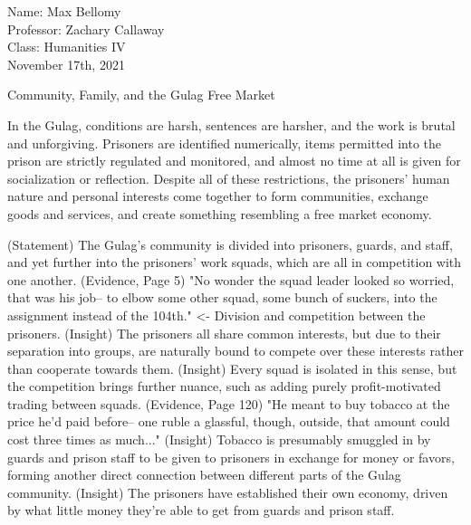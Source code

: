 \documentclass[12pt]{article}
\begin{document}
\begin{flushleft}

Name: Max Bellomy\\
Professor: Zachary Callaway\\
Class: Humanities IV\\
November 17th, 2021\\

\begin{center}
Community, Family, and the Gulag Free Market
\end{center}


\setlength{\parindent}{0.5in}


In the Gulag, conditions are harsh, sentences are harsher, and the work is brutal and unforgiving.
Prisoners are identified numerically, items permitted into the prison are strictly regulated and monitored, and almost no time at all is given for socialization or reflection.
Despite all of these restrictions, the prisoners' human nature and personal interests come together to form communities, exchange goods and services, and create something resembling a free market economy.

(Statement) The Gulag's community is divided into prisoners, guards, and staff, and yet further into the prisoners' work squads, which are all in competition with one another.
(Evidence, Page 5) "No wonder the squad leader looked so worried, that was his job-- to elbow some other squad, some bunch of suckers, into the assignment instead of the 104th." <- Division and competition between the prisoners.
(Insight) The prisoners all share common interests, but due to their separation into groups, are naturally bound to compete over these interests rather than cooperate towards them.
(Insight) Every squad is isolated in this sense, but the competition brings further nuance, such as adding purely profit-motivated trading between squads.
(Evidence, Page 120) "He meant to buy tobacco at the price he'd paid before-- one ruble a glassful, though, outside, that amount could cost three times as much..."  
(Insight) Tobacco is presumably smuggled in by guards and prison staff to be given to prisoners in exchange for money or favors, forming another direct connection between different parts of the Gulag community.
(Insight) The prisoners have established their own economy, driven by what little money they're able to get from guards and prison staff.



\end{flushleft}
\end{document}
